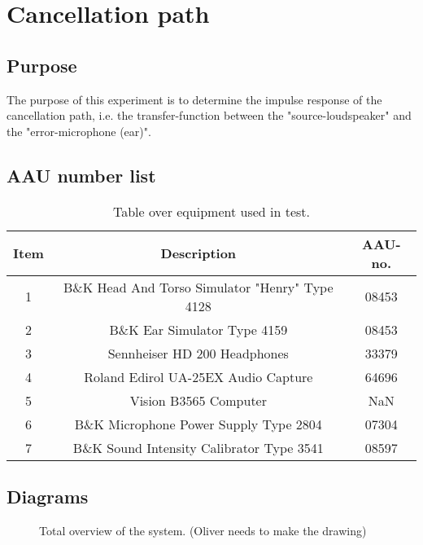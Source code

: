 \section{Cancellation path}
\subsection{Purpose}
The purpose of this experiment is to determine the impulse response of the cancellation path, i.e. the transfer-function between the "source-loudspeaker" and the "error-microphone (ear)".
		
\subsection{AAU number list}
\begin{table}[h]
	\centering
	\begin{tabular}{ c c c } \toprule
		{Item}	& {Description} 						& {AAU-no}. \\ \bottomrule 
		1	&	B\&K Head And Torso Simulator "Henry" Type 4128	& 08453		\\
		2	&	B\&K Ear Simulator Type 4159			& 08453		\\
		3	&	Sennheiser HD 200	Headphones			& 33379		\\
		4	&	Roland Edirol UA-25EX Audio Capture		& 64696		\\
		5	&	Vision B3565 Computer					& NaN		\\
		6	&	B\&K Microphone Power Supply Type 2804	& 07304		\\
		7	&	B\&K Sound Intensity Calibrator Type 3541	& 08597	\\ \bottomrule
	\end{tabular}
	\caption{Table over equipment used in test.}
	\label{tab:UsedEquipmentListningCP}
\end{table}

\subsection{Diagrams}
\begin{figure}[H]
	\centering
	
	\caption{Total overview of the system. (Oliver needs to make the drawing)}
	\label{SchematicOverview}
\end{figure}

